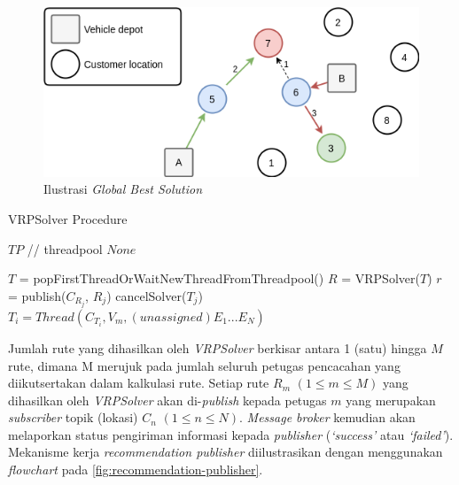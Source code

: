 \begin{figure}[!]
	\centering
	\includegraphics[width=12cm]{Resources/Images/global-best-greedy-solution}
	\caption{Ilustrasi \textit{Global Best Solution}}
	\label{fig:global-best-greedy-solution}
\end{figure}


\begin{algorithm}[!]
	\caption{VRPSolver Procedure}
	\label{alg:vrp-worker}
	\begin{algorithmic}[1]
		\renewcommand{\algorithmicrequire}{\textbf{Input:}}
		\renewcommand{\algorithmicensure}{\textbf{Output:}}
		\REQUIRE $TP$		// threadpool
		\ENSURE  $None$
		
		\STATE $T$ = popFirstThreadOrWaitNewThreadFromThreadpool()
		\STATE $R$ = VRPSolver($T$)
		\STATE $r$ = publish($C_{R_j}$, $R_j$)
		\STATE cancelSolver($T_j$)
		\STATE $T_i = Thread(C_{T_i}, V_m, (unassigned) E_1...E_N)$
		\ENDIF
		\ENDFOR
		\ENDWHILE	
	\end{algorithmic}
\end{algorithm}


Jumlah rute yang dihasilkan oleh \textit{VRPSolver} berkisar antara 1 (satu) hingga $M$ rute, dimana M merujuk pada jumlah seluruh petugas pencacahan yang diikutsertakan dalam kalkulasi rute. Setiap rute $R_m$ $(1 \leq m \leq M)$ yang dihasilkan oleh \textit{VRPSolver} akan di-\textit{publish} kepada petugas $m$ yang merupakan \textit{subscriber} topik (lokasi) $C_n$ $(1 \leq n \leq N)$. \textit{Message broker} kemudian akan melaporkan status pengiriman informasi kepada \textit{publisher} (\textit{`success'} atau \textit{`failed'}). Mekanisme kerja \textit{recommendation publisher} diilustrasikan dengan menggunakan \textit{flowchart} pada \autoref{fig:recommendation-publisher}.


